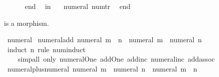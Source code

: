 \begin{isabellebody}
\ \ \ \ \ \ end{\isacharsemicolon}{\kern0pt}\isanewline
\ \ in\isanewline
\ \ \ {\isacharbrackleft}{\kern0pt}{\isacharparenleft}{\kern0pt}\isactrlconstUNDERSCOREsyntax {\isasymopen}numeral{\isasymclose}{\isacharcomma}{\kern0pt}\ num{\isacharunderscore}{\kern0pt}tr{\isacharprime}{\kern0pt}{\isacharparenright}{\kern0pt}{\isacharbrackright}{\kern0pt}\isanewline
\ \ end\isanewline
{\isacartoucheclose}%
\endisatagML
{\isafoldML}%
%
\isadelimML
%
\endisadelimML
%
\isadelimdocument
%
\endisadelimdocument
%
\isatagdocument
%
\isamarkuptrue%
%
\endisatagdocument
{\isafolddocument}%
%
\isadelimdocument
%
\endisadelimdocument
%
\begin{isamarkuptext}%
 is a morphism.%
\end{isamarkuptext}\isamarkuptrue%
%
\isadelimdocument
%
\endisadelimdocument
%
\isatagdocument
%
\isamarkuptrue%
%
\endisatagdocument
{\isafolddocument}%
%
\isadelimdocument
%
\endisadelimdocument
{}\isamarkupfalse%
\ numeral\isanewline
{}\isanewline
\isanewline
{}\isamarkupfalse%
\ numeral{\isacharunderscore}{\kern0pt}add{\isacharcolon}{\kern0pt}\ {\isachardoublequoteopen}numeral\ {\isacharparenleft}{\kern0pt}m\ {\isacharplus}{\kern0pt}\ n{\isacharparenright}{\kern0pt}\ {\isacharequal}{\kern0pt}\ numeral\ m\ {\isacharplus}{\kern0pt}\ numeral\ n{\isachardoublequoteclose}\isanewline
%
\isadelimproof
\ \ %
\endisadelimproof
%
\isatagproof
{}\isamarkupfalse%
\ {\isacharparenleft}{\kern0pt}induct\ n\ rule{\isacharcolon}{\kern0pt}\ num{\isacharunderscore}{\kern0pt}induct{\isacharparenright}{\kern0pt}\isanewline
\ \ \ \ {\isacharparenleft}{\kern0pt}simp{\isacharunderscore}{\kern0pt}all\ only{\isacharcolon}{\kern0pt}\ numeral{\isacharunderscore}{\kern0pt}One\ add{\isacharunderscore}{\kern0pt}One\ add{\isacharunderscore}{\kern0pt}inc\ numeral{\isacharunderscore}{\kern0pt}inc\ add{\isachardot}{\kern0pt}assoc{\isacharparenright}{\kern0pt}%
\endisatagproof
{\isafoldproof}%
%
\isadelimproof
\isanewline
%
\endisadelimproof
\isanewline
{}\isamarkupfalse%
\ numeral{\isacharunderscore}{\kern0pt}plus{\isacharunderscore}{\kern0pt}numeral{\isacharcolon}{\kern0pt}\ {\isachardoublequoteopen}numeral\ m\ {\isacharplus}{\kern0pt}\ numeral\ n\ {\isacharequal}{\kern0pt}\ numeral\ {\isacharparenleft}{\kern0pt}m\ {\isacharplus}{\kern0pt}\ n{\isacharparenright}{\kern0pt}{\isachardoublequoteclose}\isanewline
%
\isadelimproof
\ \ %
\endisadelimproof

\end{isabellebody}
